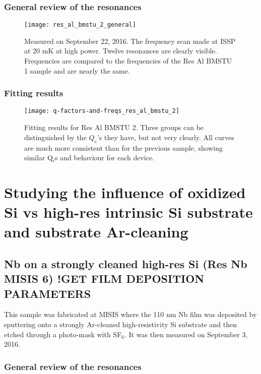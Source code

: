 \documentclass[12pt]{article}
\numberwithin{equation}{section}
\numberwithin{figure}{section}
\begin{document}
\subsubsection{General review of the resonances}

\begin{figure}[h!]
\centering
\texttt{[image: res\_al\_bmstu\_2\_general]}
\caption{Measured on September 22, 2016. The frequency scan made at ISSP at 20 mK at high power. Twelve resonances are clearly visible. Frequencies are compared to the frequencies of the Res Al BMSTU 1 sample and are nearly the same.}
\end{figure}

\subsubsection{Fitting results}

\begin{figure}
\centering
\vspace*{-1cm}
\texttt{[image: q-factors-and-freqs\_res\_al\_bmstu\_2]}
\caption{Fitting results for Res Al BMSTU 2. Three groups can be distinguished by the $Q_e$'s they have, but not very clearly. All curves are much more consistent than for the previous sample, showing similar Q$_i$s and behaviour for each device.}
\label{fig:fit_al_bmstu}
\end{figure}
\newpage
\section{Studying the influence of oxidized Si vs high-res intrinsic Si substrate and substrate Ar-cleaning}

\subsection{Nb on a strongly cleaned high-res Si (Res Nb MISIS 6) !GET FILM DEPOSITION PARAMETERS}

This sample was fabricated at MISIS where the 110 nm Nb film was deposited by sputtering onto a strongly Ar-cleaned high-resistivity Si substrate and then etched through a photo-mask with SF$_6$. It was then measured on September 3, 2016.

\subsubsection{General review of the resonances}
\end{document}
